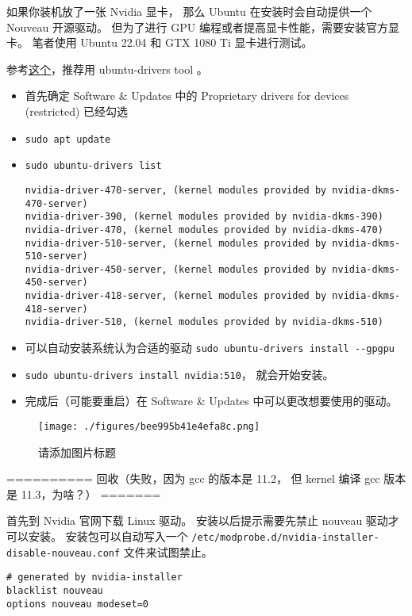 
如果你装机放了一张 Nvidia 显卡， 那么 Ubuntu 在安装时会自动提供一个 Nouveau 开源驱动。 但为了进行 GPU 编程或者提高显卡性能，需要安装官方显卡。 笔者使用 Ubuntu 22.04 和 GTX 1080 Ti 显卡进行测试。

参考\href{https://ubuntu.com/server/docs/nvidia-drivers-installation}{这个}，推荐用 ubuntu-drivers tool 。

\begin{itemize}
\item 首先确定 Software & Updates 中的 Proprietary drivers for devices (restricted) 已经勾选
\item \verb`sudo apt update`
\item \verb`sudo ubuntu-drivers list`
\begin{lstlisting}[language=none]
nvidia-driver-470-server, (kernel modules provided by nvidia-dkms-470-server)
nvidia-driver-390, (kernel modules provided by nvidia-dkms-390)
nvidia-driver-470, (kernel modules provided by nvidia-dkms-470)
nvidia-driver-510-server, (kernel modules provided by nvidia-dkms-510-server)
nvidia-driver-450-server, (kernel modules provided by nvidia-dkms-450-server)
nvidia-driver-418-server, (kernel modules provided by nvidia-dkms-418-server)
nvidia-driver-510, (kernel modules provided by nvidia-dkms-510)
\end{lstlisting}
\item 可以自动安装系统认为合适的驱动 \verb`sudo ubuntu-drivers install --gpgpu`
\item \verb`sudo ubuntu-drivers install nvidia:510`， 就会开始安装。
\item 完成后（可能要重启）在 Software & Updates 中可以更改想要使用的驱动。
\end{itemize}
\begin{figure}[ht]
\centering
\texttt{[image: ./figures/bee995b41e4efa8c.png]}
\caption{请添加图片标题} \label{fig_NvDrUb_1}
\end{figure}




========== 回收（失败，因为 gcc 的版本是 11.2， 但 kernel 编译 gcc 版本是 11.3，为啥？） =======

首先到 Nvidia 官网下载 Linux 驱动。 安装以后提示需要先禁止 nouveau 驱动才可以安装。 安装包可以自动写入一个 \verb`/etc/modprobe.d/nvidia-installer-disable-nouveau.conf` 文件来试图禁止。
\begin{lstlisting}[language=none,caption=nvidia-installer-disable-nouveau.conf]
# generated by nvidia-installer
blacklist nouveau
options nouveau modeset=0
\end{lstlisting}

